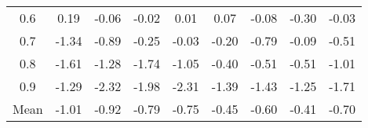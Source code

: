\documentclass[11pt,a4paper]{report}
\begin{document}
\begin{longtable}{ | c || c | c | c | c | c | c | c || c |}
0.6 &  \cellcolor[HTML]{F7F7FF} 0.19 &  \cellcolor[HTML]{FFFFFF} -0.06 &  \cellcolor[HTML]{FFFFFF} -0.02 &  \cellcolor[HTML]{FFFFFF} 0.01 &  \cellcolor[HTML]{FFFFFF} 0.07 &  \cellcolor[HTML]{FFFFFF} -0.08 &  \cellcolor[HTML]{FFF7F7} -0.30 &  \cellcolor[HTML]{FFFFFF} -0.03 \\
0.7 &  \cellcolor[HTML]{FFDFDF} -1.34 &  \cellcolor[HTML]{FFE7E7} -0.89 &  \cellcolor[HTML]{FFF7F7} -0.25 &  \cellcolor[HTML]{FFFFFF} -0.03 &  \cellcolor[HTML]{FFF7F7} -0.20 &  \cellcolor[HTML]{FFEFEF} -0.79 &  \cellcolor[HTML]{FFFFFF} -0.09 &  \cellcolor[HTML]{FFEFEF} -0.51 \\
0.8 &  \cellcolor[HTML]{FFD7D7} -1.61 &  \cellcolor[HTML]{FFDFDF} -1.28 &  \cellcolor[HTML]{FFD7D7} -1.74 &  \cellcolor[HTML]{FFE7E7} -1.05 &  \cellcolor[HTML]{FFF7F7} -0.40 &  \cellcolor[HTML]{FFEFEF} -0.51 &  \cellcolor[HTML]{FFEFEF} -0.51 &  \cellcolor[HTML]{FFE7E7} -1.01 \\
0.9 &  \cellcolor[HTML]{FFDFDF} -1.29 &  \cellcolor[HTML]{FFC7C7} -2.32 &  \cellcolor[HTML]{FFCFCF} -1.98 &  \cellcolor[HTML]{FFC7C7} -2.31 &  \cellcolor[HTML]{FFDFDF} -1.39 &  \cellcolor[HTML]{FFD7D7} -1.43 &  \cellcolor[HTML]{FFDFDF} -1.25 &  \cellcolor[HTML]{FFD7D7} -1.71 \\
\hline
\hline
Mean  &  \cellcolor[HTML]{FFE7E7} -1.01 &  \cellcolor[HTML]{FFE7E7} -0.92 &  \cellcolor[HTML]{FFEFEF} -0.79 &  \cellcolor[HTML]{FFEFEF} -0.75 &  \cellcolor[HTML]{FFF7F7} -0.45 &  \cellcolor[HTML]{FFEFEF} -0.60 &  \cellcolor[HTML]{FFF7F7} -0.41 &  \cellcolor[HTML]{FFEFEF} -0.70 \\
\hline
\end{longtable}
\end{document}
